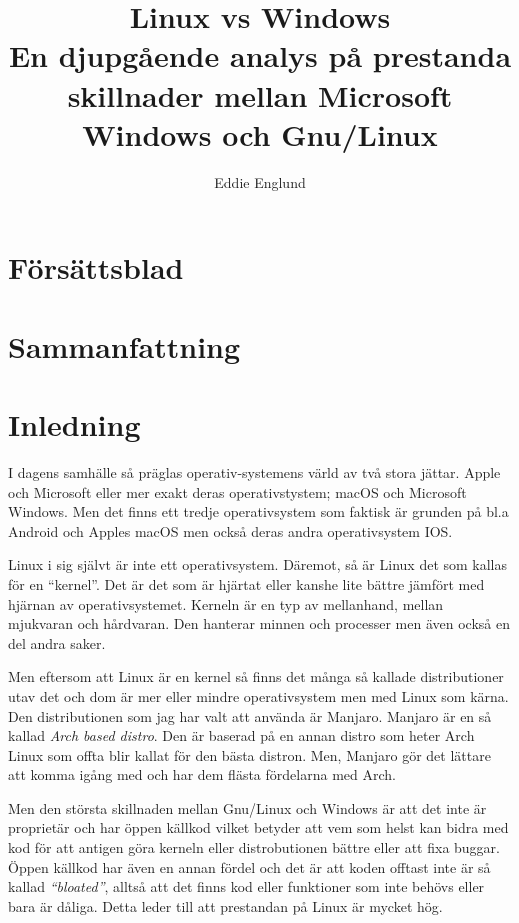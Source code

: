 \documentclass[a4paper, 12pt]{article}
\author{Eddie Englund}
\title{Linux vs Windows\\[0.2em]\smaller{}En djupgående analys på prestanda skillnader mellan Microsoft Windows och Gnu/Linux}
\begin{document}
\maketitle


\tableofcontents

\section{Försättsblad}\label{flyleaf}


\section{Sammanfattning}\label{sum}

    \begin{abstract}

    \end{abstract}

\section{Inledning}


    I dagens samhälle så präglas operativ-systemens värld av två stora jättar. Apple och Microsoft eller mer exakt deras operativstystem; macOS och Microsoft Windows. Men det finns ett tredje operativsystem som faktisk är grunden på bl.a Android och Apples macOS men också deras andra operativsystem IOS.

    Linux i sig självt är inte ett operativsystem. Däremot, så är Linux det som kallas för en ``kernel''\cite{redhat}. Det är det som är hjärtat eller kanshe lite bättre jämfört med hjärnan av operativsystemet. Kerneln är en typ av mellanhand, mellan mjukvaran och hårdvaran. Den hanterar minnen och processer men även också en del andra saker.

    Men eftersom att Linux är en kernel så finns det många så kallade distributioner utav det och dom är mer eller mindre operativsystem men med Linux som kärna. Den distributionen som jag har valt att använda är Manjaro\cite{manjaro}. Manjaro är en så kallad \textit{Arch based distro}. Den är baserad på en annan distro som heter Arch Linux som offta blir kallat för den bästa distron. Men, Manjaro gör det lättare att komma igång med och har dem flästa fördelarna med Arch.

    Men den största skillnaden mellan Gnu/Linux och Windows är att det inte är proprietär och har öppen källkod vilket betyder att vem som helst kan bidra med kod för att antigen göra kerneln eller distrobutionen bättre eller att fixa buggar. Öppen källkod har även en annan fördel och det är att koden offtast inte är så kallad \textit{``bloated''}, alltså att det finns kod eller funktioner som inte behövs eller bara är dåliga. Detta leder till att prestandan på Linux är mycket hög. 
    
\end{document}
